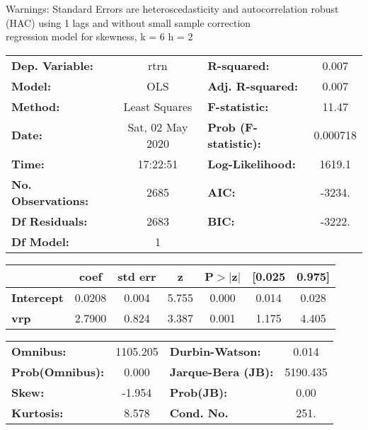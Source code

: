 Warnings: \newline
 [1] Standard Errors are heteroscedasticity and autocorrelation robust (HAC) using 1 lags and without small sample correction\\ 

regression model for skewness, k = 6 h = 2\begin{center}
\begin{tabular}{lclc}
\toprule
\textbf{Dep. Variable:}    &       rtrn       & \textbf{  R-squared:         } &     0.007   \\
\textbf{Model:}            &       OLS        & \textbf{  Adj. R-squared:    } &     0.007   \\
\textbf{Method:}           &  Least Squares   & \textbf{  F-statistic:       } &     11.47   \\
\textbf{Date:}             & Sat, 02 May 2020 & \textbf{  Prob (F-statistic):} &  0.000718   \\
\textbf{Time:}             &     17:22:51     & \textbf{  Log-Likelihood:    } &    1619.1   \\
\textbf{No. Observations:} &        2685      & \textbf{  AIC:               } &    -3234.   \\
\textbf{Df Residuals:}     &        2683      & \textbf{  BIC:               } &    -3222.   \\
\textbf{Df Model:}         &           1      & \textbf{                     } &             \\
\bottomrule
\end{tabular}
\begin{tabular}{lcccccc}
                   & \textbf{coef} & \textbf{std err} & \textbf{z} & \textbf{P$> |$z$|$} & \textbf{[0.025} & \textbf{0.975]}  \\
\midrule
\textbf{Intercept} &       0.0208  &        0.004     &     5.755  &         0.000        &        0.014    &        0.028     \\
\textbf{vrp}       &       2.7900  &        0.824     &     3.387  &         0.001        &        1.175    &        4.405     \\
\bottomrule
\end{tabular}
\begin{tabular}{lclc}
\textbf{Omnibus:}       & 1105.205 & \textbf{  Durbin-Watson:     } &    0.014  \\
\textbf{Prob(Omnibus):} &   0.000  & \textbf{  Jarque-Bera (JB):  } & 5190.435  \\
\textbf{Skew:}          &  -1.954  & \textbf{  Prob(JB):          } &     0.00  \\
\textbf{Kurtosis:}      &   8.578  & \textbf{  Cond. No.          } &     251.  \\
\bottomrule
\end{tabular}
\end{center}

